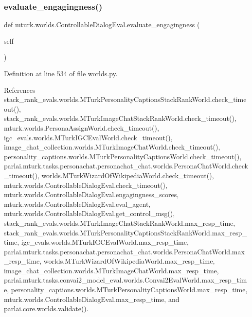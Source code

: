 \subsubsection{\texorpdfstring{evaluate\+\_\+engagingness()}{evaluate\_engagingness()}}
{\footnotesize\ttfamily def mturk.\+worlds.\+Controllable\+Dialog\+Eval.\+evaluate\+\_\+engagingness (\begin{DoxyParamCaption}\item[{}]{self }\end{DoxyParamCaption})}



Definition at line 534 of file worlds.\+py.



References stack\+\_\+rank\+\_\+evals.\+worlds.\+M\+Turk\+Personality\+Captions\+Stack\+Rank\+World.\+check\+\_\+timeout(), stack\+\_\+rank\+\_\+evals.\+worlds.\+M\+Turk\+Image\+Chat\+Stack\+Rank\+World.\+check\+\_\+timeout(), mturk.\+worlds.\+Persona\+Assign\+World.\+check\+\_\+timeout(), igc\+\_\+evals.\+worlds.\+M\+Turk\+I\+G\+C\+Eval\+World.\+check\+\_\+timeout(), image\+\_\+chat\+\_\+collection.\+worlds.\+M\+Turk\+Image\+Chat\+World.\+check\+\_\+timeout(), personality\+\_\+captions.\+worlds.\+M\+Turk\+Personality\+Captions\+World.\+check\+\_\+timeout(), parlai.\+mturk.\+tasks.\+personachat.\+personachat\+\_\+chat.\+worlds.\+Persona\+Chat\+World.\+check\+\_\+timeout(), worlds.\+M\+Turk\+Wizard\+Of\+Wikipedia\+World.\+check\+\_\+timeout(), mturk.\+worlds.\+Controllable\+Dialog\+Eval.\+check\+\_\+timeout(), mturk.\+worlds.\+Controllable\+Dialog\+Eval.\+engagingness\+\_\+scores, mturk.\+worlds.\+Controllable\+Dialog\+Eval.\+eval\+\_\+agent, mturk.\+worlds.\+Controllable\+Dialog\+Eval.\+get\+\_\+control\+\_\+msg(), stack\+\_\+rank\+\_\+evals.\+worlds.\+M\+Turk\+Image\+Chat\+Stack\+Rank\+World.\+max\+\_\+resp\+\_\+time, stack\+\_\+rank\+\_\+evals.\+worlds.\+M\+Turk\+Personality\+Captions\+Stack\+Rank\+World.\+max\+\_\+resp\+\_\+time, igc\+\_\+evals.\+worlds.\+M\+Turk\+I\+G\+C\+Eval\+World.\+max\+\_\+resp\+\_\+time, parlai.\+mturk.\+tasks.\+personachat.\+personachat\+\_\+chat.\+worlds.\+Persona\+Chat\+World.\+max\+\_\+resp\+\_\+time, worlds.\+M\+Turk\+Wizard\+Of\+Wikipedia\+World.\+max\+\_\+resp\+\_\+time, image\+\_\+chat\+\_\+collection.\+worlds.\+M\+Turk\+Image\+Chat\+World.\+max\+\_\+resp\+\_\+time, parlai.\+mturk.\+tasks.\+convai2\+\_\+model\+\_\+eval.\+worlds.\+Convai2\+Eval\+World.\+max\+\_\+resp\+\_\+time, personality\+\_\+captions.\+worlds.\+M\+Turk\+Personality\+Captions\+World.\+max\+\_\+resp\+\_\+time, mturk.\+worlds.\+Controllable\+Dialog\+Eval.\+max\+\_\+resp\+\_\+time, and parlai.\+core.\+worlds.\+validate().



